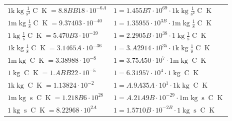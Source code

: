 \begin{center}
\begin{longtable}{l l}
{\color{gray}$1 \bm{\mathrm{ k}}\operatorname{kg}{}\frac1{\operatorname{s}^2}{\operatorname{C}}{\operatorname{K}} = 8.8BB18\cdot10^{-6A} $}   & {\color{gray}$ 1 = 1.455B7\cdot10^{69} \cdot 1 \bm{\mathrm{ k}}\operatorname{kg}{}\frac1{\operatorname{s}^2}{\operatorname{C}}{\operatorname{K}}$}  \\
{\color{gray}$1 \bm{\mathrm{ m}}\operatorname{kg}{}\frac1{\operatorname{s}}{\operatorname{C}}{\operatorname{K}} = 9.37403\cdot10^{-40} $}   & {\color{gray}$ 1 = 1.35955\cdot10^{3B} \cdot 1 \bm{\mathrm{ m}}\operatorname{kg}{}\frac1{\operatorname{s}}{\operatorname{C}}{\operatorname{K}}$}  \\
{\color{black}$1 \bm{\mathrm{ }}\operatorname{kg}{}\frac1{\operatorname{s}}{\operatorname{C}}{\operatorname{K}} = 5.470B3\cdot10^{-39} $}   & {\color{black}$ 1 = 2.2905B\cdot10^{38} \cdot 1 \bm{\mathrm{ }}\operatorname{kg}{}\frac1{\operatorname{s}}{\operatorname{C}}{\operatorname{K}}$}  \\
{\color{gray}$1 \bm{\mathrm{ k}}\operatorname{kg}{}\frac1{\operatorname{s}}{\operatorname{C}}{\operatorname{K}} = 3.1465A\cdot10^{-36} $}   & {\color{gray}$ 1 = 3.A2914\cdot10^{35} \cdot 1 \bm{\mathrm{ k}}\operatorname{kg}{}\frac1{\operatorname{s}}{\operatorname{C}}{\operatorname{K}}$}  \\
{\color{gray}$1 \bm{\mathrm{ m}}\operatorname{kg}{}{}{\operatorname{C}}{\operatorname{K}} = 3.38988\cdot10^{-8} $}   & {\color{gray}$ 1 = 3.75A50\cdot10^{7} \cdot 1 \bm{\mathrm{ m}}\operatorname{kg}{}{}{\operatorname{C}}{\operatorname{K}}$}  \\
{\color{black}$1 \bm{\mathrm{ }}\operatorname{kg}{}{}{\operatorname{C}}{\operatorname{K}} = 1.ABB22\cdot10^{-5} $}   & {\color{black}$ 1 = 6.31957\cdot10^{4} \cdot 1 \bm{\mathrm{ }}\operatorname{kg}{}{}{\operatorname{C}}{\operatorname{K}}$}  \\
{\color{gray}$1 \bm{\mathrm{ k}}\operatorname{kg}{}{}{\operatorname{C}}{\operatorname{K}} = 1.13824\cdot10^{-2} $}   & {\color{gray}$ 1 = A.9A35A\cdot10^{1} \cdot 1 \bm{\mathrm{ k}}\operatorname{kg}{}{}{\operatorname{C}}{\operatorname{K}}$}  \\
{\color{gray}$1 \bm{\mathrm{ m}}\operatorname{kg}{}{\operatorname{s}}{\operatorname{C}}{\operatorname{K}} = 1.218B6\cdot10^{28} $}   & {\color{gray}$ 1 = A.21A9B\cdot10^{-29} \cdot 1 \bm{\mathrm{ m}}\operatorname{kg}{}{\operatorname{s}}{\operatorname{C}}{\operatorname{K}}$}  \\
{\color{black}$1 \bm{\mathrm{ }}\operatorname{kg}{}{\operatorname{s}}{\operatorname{C}}{\operatorname{K}} = 8.22968\cdot10^{2A} $}   & {\color{black}$ 1 = 1.5710B\cdot10^{-2B} \cdot 1 \bm{\mathrm{ }}\operatorname{kg}{}{\operatorname{s}}{\operatorname{C}}{\operatorname{K}}$}  \\

\end{longtable}
\end{center}
